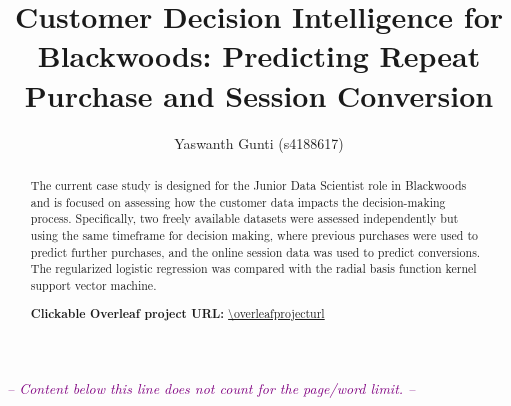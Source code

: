 \documentclass[manuscript,screen,review,nonacm]{acmart}
\begin{document}
\title{Customer Decision Intelligence for Blackwoods: Predicting Repeat Purchase and Session Conversion}


\author{Yaswanth Gunti (s4188617)}

\renewcommand{\shortauthors}{Gunti}

\begin{abstract}
The current case study is designed for the Junior Data Scientist role in Blackwoods and is focused on assessing how the customer data impacts the decision-making process. Specifically, two freely available datasets were assessed independently but using the same timeframe for decision making, where previous purchases were used to predict further purchases, and the online session data was used to predict conversions. The regularized logistic regression was compared with the radial basis function kernel support vector machine.

\medskip
\noindent\textbf{Clickable Overleaf project URL:} \url{\overleafprojecturl}
\end{abstract}



\maketitle







\clearpage
\begin{center}
    \noindent \textcolor{purple}{\emph{-- Content below this line does not count for the page/word limit. --}}
\end{center}
\end{document}
